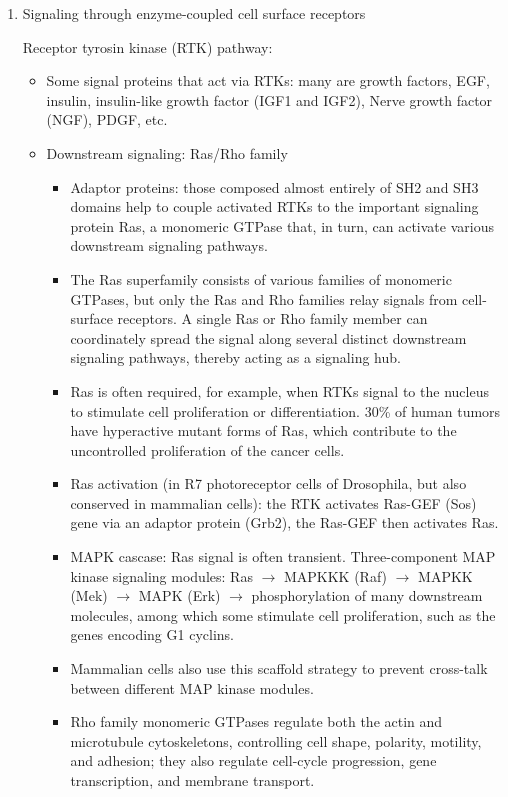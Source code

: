 \documentclass{report}
\begin{document}
\begin{enumerate}
\item{Signaling through enzyme-coupled cell surface receptors}

Receptor tyrosin kinase (RTK) pathway: 
\begin{itemize}
\item Some signal proteins that act via RTKs: many are growth factors, EGF, insulin, insulin-like growth factor (IGF1 and IGF2), Nerve growth factor (NGF), PDGF, etc. 

\item Downstream signaling: Ras/Rho family
\begin{itemize}
	\item Adaptor proteins: those composed almost entirely of SH2 and SH3 domains help to couple activated RTKs to the important signaling protein Ras, a monomeric GTPase that, in turn, can activate various downstream signaling pathways. 
	\item The Ras superfamily consists of various families of monomeric GTPases, but only the Ras and Rho families relay signals from cell-surface receptors. A single Ras or Rho family member can coordinately spread the signal along several distinct downstream signaling pathways, thereby acting as a signaling hub.
	\item Ras is often required, for example, when RTKs signal to the nucleus to stimulate cell proliferation or differentiation. 30\% of human tumors have hyperactive mutant forms of Ras, which contribute to the uncontrolled proliferation of the cancer cells.
	\item Ras activation (in R7 photoreceptor cells of Drosophila, but also conserved in mammalian cells): the RTK activates Ras-GEF (Sos) gene via an adaptor protein (Grb2), the Ras-GEF then activates Ras. 	
	\item MAPK cascase: Ras signal is often transient. Three-component MAP kinase signaling modules: Ras $\rightarrow$ MAPKKK (Raf) $\rightarrow$ MAPKK (Mek) $\rightarrow$ MAPK (Erk) $\rightarrow$ phosphorylation of many downstream molecules, among which some stimulate cell proliferation, such as the genes encoding G1 cyclins. 
	\item Mammalian cells also use this scaffold strategy to prevent cross-talk between different MAP kinase modules.
	\item Rho family monomeric GTPases regulate both the actin and microtubule cytoskeletons, controlling cell shape, polarity, motility, and adhesion; they also regulate cell-cycle progression, gene transcription, and membrane transport. 
\end{itemize}


\end{itemize}
\end{enumerate}
\end{document}
